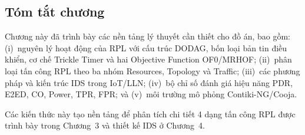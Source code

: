 \subsection{Tóm tắt chương}
\label{subsec:ch2_summary}

Chương này đã trình bày các nền tảng lý thuyết cần thiết cho đồ án, bao
gồm: (i)~nguyên lý hoạt động của RPL với cấu trúc DODAG, bốn loại bản
tin điều khiển, cơ chế Trickle Timer và hai Objective Function OF0/MRHOF;
(ii)~phân loại tấn công RPL theo ba nhóm Resources, Topology và Traffic;
(iii)~các phương pháp và kiến trúc IDS trong IoT/LLN; (iv)~bộ chỉ số
đánh giá hiệu năng PDR, E2ED, CO, Power, TPR, FPR; và (v)~môi trường
mô phỏng Contiki-NG/Cooja.

Các kiến thức này tạo nền tảng để phân tích chi tiết 4 dạng tấn công RPL
được trình bày trong Chương~3 và thiết kế IDS ở Chương~4.